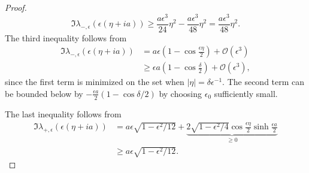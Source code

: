 \begin{proof}
	\begin{equation*}
		\Im \lambda_{-,\epsilon}(\epsilon(\eta + ia)) \geq \frac{a\epsilon^3}{24} \eta^2 - \frac{a\epsilon^3}{48} \eta^2 = \frac{a\epsilon^3}{48} \eta^2.
	\end{equation*}
	The third inequality follows from
	\begin{align*}
		\Im \lambda_{-,\epsilon}(\epsilon(\eta + ia)) &= a \epsilon (1-\cos \frac{\epsilon \eta} 2) + \mathcal O(\epsilon^3) \\
		&\geq \epsilon a (1- \cos\frac \delta 2) + \mathcal O(\epsilon^3),
	\end{align*}
	since the first term is minimized on the set when \(|\eta| = \delta \epsilon^{-1} \). The second term can be bounded below by \(-\frac{\epsilon a} 2(1-\cos\delta /2) \) by choosing \(\epsilon_0\) sufficiently small.
	
	The last inequality follows from
	\begin{align*}
		\Im \lambda_{+,\epsilon}(\epsilon(\eta+ia)) &=  a \epsilon\sqrt{1 - \epsilon^2/ 12} + \underbrace{2 \sqrt{1-\epsilon^2/4} \cos\frac{\epsilon \eta} 2 \sinh\frac{\epsilon a} 2}_{\geq 0} \\
		&\geq  a \epsilon\sqrt{1 - \epsilon^2/ 12}.
	\end{align*}
\end{proof}


